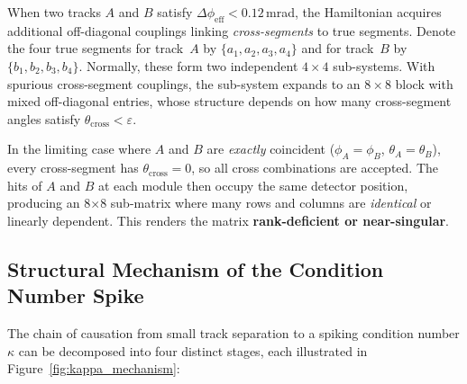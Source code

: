 \documentclass[12pt,a4paper]{article}
\newcommand{\eps}{\varepsilon}
\begin{document}
When two tracks $A$ and $B$ satisfy $\Delta\phi_\text{eff} < 0.12$\,mrad,
the Hamiltonian acquires additional off-diagonal couplings linking
\emph{cross-segments} to true segments.
Denote the four true segments for track~$A$ by
$\{a_1, a_2, a_3, a_4\}$ and for track~$B$ by $\{b_1, b_2, b_3, b_4\}$.
Normally, these form two independent $4\times4$ sub-systems.
With spurious cross-segment couplings, the sub-system expands to
an $8\times8$ block with mixed off-diagonal entries, whose structure
depends on how many cross-segment angles satisfy $\theta_\text{cross}<\eps$.

In the limiting case where $A$ and $B$ are \emph{exactly} coincident
($\phi_A = \phi_B$, $\theta_A = \theta_B$), every cross-segment has
$\theta_\text{cross} = 0$, so all cross combinations are accepted.
The hits of $A$ and $B$ at each module then occupy the same detector position,
producing an 8$\times$8 sub-matrix where many rows and columns are
\emph{identical} or linearly dependent.
This renders the matrix \textbf{rank-deficient or near-singular}.

\subsection{Structural Mechanism of the Condition Number Spike}
\label{sec:kappa_mechanism}

The chain of causation from small track separation to a spiking condition
number $\kappa$ can be decomposed into four distinct stages, each
illustrated in Figure~\ref{fig:kappa_mechanism}:
\end{document}
